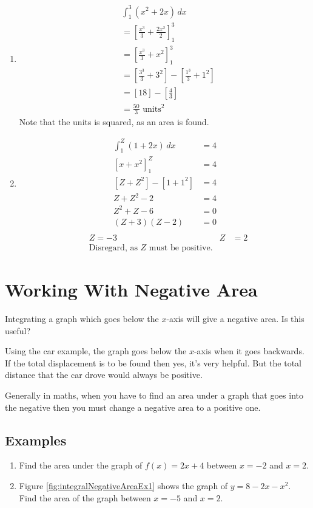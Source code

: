 \begin{enumerate}
	\item
	\begin{align*}
		&\int_{1}^{3} (x^2 + 2x) \, dx\\
		&=\left[ \frac{x^3}{3} + \frac{2x^2}{2} \right]_1^3\\
		&=\left[ \frac{x^3}{3} + x^2 \right]_1^3\\
		&=\left[ \frac{3^3}{3} + 3^2 \right] - \left[ \frac{1^3}{3} + {1^2} \right]\\
		&= \left[ 18 \right] - \left[ \frac{4}{3} \right]\\
		&= \frac{50}{3} \text{ units}^2
	\end{align*}
	Note that the units is squared, as an area is found.
	
	\item
	\begin{align*}
		\int_{1}^{Z} (1+2x) \, dx &= 4\\
		\left[ x+x^2 \right]_1^Z &= 4\\
		\left[ Z+Z^2 \right] - \left[ 1+1^2 \right] &= 4\\
		Z+Z^2 - 2 &= 4\\
		Z^2+Z - 6 &= 0\\
		\left(Z+3\right)\left(Z-2\right) &= 0\\
	\end{align*}
	\begin{align*}
		&Z=-3 & Z&=2\\
		&\text{Disregard, as $Z$ must be positive.} & &
	\end{align*}
\end{enumerate}

\section{Working With Negative Area}
Integrating a graph which goes below the $x$-axis will give a negative area. Is this useful?

Using the car example, the graph goes below the $x$-axis when it goes backwards. If the total displacement is to be found then yes, it's very helpful. But the total distance that the car drove would always be positive.

Generally in maths, when you have to find an area under a graph that goes into the negative then you must change a negative area to a positive one.

\subsection{Examples}
\begin{enumerate}
	\item
	Find the area under the graph of $f(x) = 2x+4$ between $x=-2$ and $x=2$.
	
	\item
	Figure \ref{fig:integralNegativeAreaEx1} shows the graph of $y=8-2x-x^2$. Find the area of the graph between $x=-5$ and $x=2$.
\end{enumerate}

